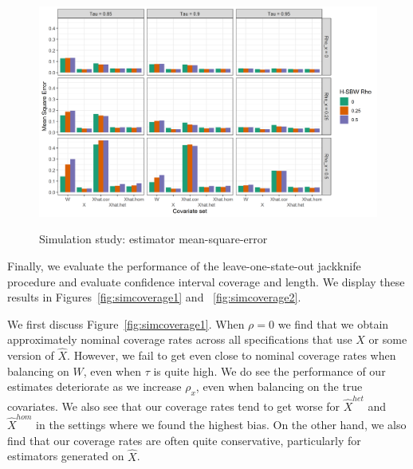 \begin{figure}[H]
\begin{center}
    \caption{Simulation study: estimator mean-square-error}\label{fig:simmse}
    \label{fig:loveplotc1}
    \includegraphics[scale=0.5]{01_Plots/mse-plot.png}
\end{center}
\end{figure}

Finally, we evaluate the performance of the leave-one-state-out jackknife procedure and evaluate confidence interval coverage and length. We display these results in Figures~\ref{fig:simcoverage1} and ~\ref{fig:simcoverage2}. 

We first discuss Figure~\ref{fig:simcoverage1}. When $\rho = 0$ we find that we obtain approximately nominal coverage rates across all specifications that use $X$ or some version of $\hat{X}$. However, we fail to get even close to nominal coverage rates when balancing on $W$, even when $\tau$ is quite high. We do see the performance of our estimates deteriorate as we increase $\rho_x$, even when balancing on the true covariates. We also see that our coverage rates tend to get worse for $\hat{X}^{het}$ and $\hat{X}^{hom}$ in the settings where we found the highest bias. On the other hand, we also find that our coverage rates are often quite conservative, particularly for estimators generated on $\hat{X}$. 

